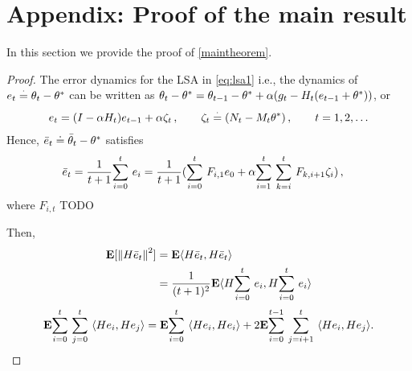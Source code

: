 \onecolumn
\section{Appendix: Proof of the main result}
In this section we provide the proof of \cref{maintheorem}.

\begin{proof}
The error dynamics for the LSA in \eqref{eq:lsa1} i.e., the dynamics of $e_t\eqdef\theta_t-\ts$ can be written as 
$\theta_t-\ts=\theta_{t-1}-\ts+\alpha(g_t -H_t(e_{t-1}+\ts))$,
or 
\begin{align}\label{lsergen}
e_t=(I-\alpha H_t)e_{t-1}+\alpha \zeta_t\,, \qquad \zeta_t\eqdef (N_t-M_t\ts)\,,\qquad  t=1,2,\dots
\end{align}
Hence, $\eb_t \doteq \tb_t-\ts$ satisfies
\begin{align*}
\eb_t&=\frac{1}{t+1}\ous{\sum}{i=0}{t}e_i
=\frac{1}{t+1}(\ous{\sum}{i=0}{t} F_{i,1} e_0+ \alpha\ous{\sum}{i=1}{t} \ous{\sum}{k=i}{t} F_{k,i+1}  \zeta_i )\,,
\end{align*}
where $F_{i,t}$ TODO

Then,
\begin{align*}
\E[\norm{H\eb_t}^2]&=\E\ip{H\eb_t,H\eb_t}\\
&=\frac{1}{(t+1)^2}\E\ip{H\ous{\sum}{i=0}{t}e_i,H\ous{\sum}{i=0}{t}e_i}
\end{align*}
\begin{align*}
\E\ous{\sum}{i=0}{t}\ous{\sum}{j=0}{t}\ip{He_i,He_j}=\E\ous{\sum}{i=0}{t}\ip{He_i,He_i}+ 2\E\ous{\sum}{i=0}{t-1}\ous{\sum}{j=i+1}{t}\ip{He_i,He_j}.
\end{align*}


\end{proof}
